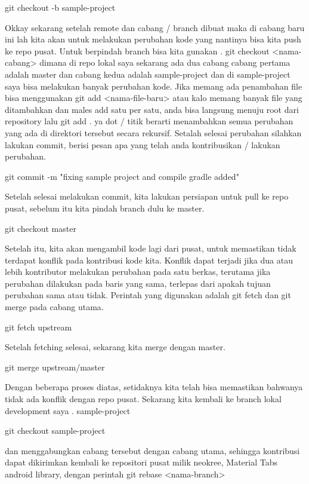 \noindent 
git checkout -b sample-project \par
\noindent 
Okkay sekarang setelah remote dan cabang / branch dibuat maka di cabang baru ini lah kita akan untuk melakukan perubahan kode yang nantinya bisa kita push ke repo pusat. Untuk berpindah branch bisa kita gunakan . git checkout <nama-cabang> dimana di repo lokal saya sekarang ada dua cabang cabang pertama adalah master dan cabang kedua adalah sample-project dan di sample-project saya bisa melakukan banyak perubahan kode. Jika memang ada penambahan file bisa menggunakan git add <nama-file-baru> atau kalo memang banyak file yang ditambahkan dan males add satu per satu, anda bisa langsung menuju root dari repository lalu git add . ya dot / titik berarti menambahkan semua perubahan yang ada di direktori tersebut secara rekursif. Setalah selesai perubahan silahkan lakukan commit, berisi pesan apa yang telah anda kontribusikan / lakukan perubahan. \par
\noindent 
git commit -m "fixing sample project and compile gradle added" \par
\noindent 
Setelah selesai melakukan commit, kita lakukan persiapan untuk pull ke repo pusat, sebelum itu kita pindah branch dulu ke master. \par
\noindent 
git checkout master \par
\noindent 
Setelah itu, kita akan mengambil kode lagi dari pusat, untuk memastikan tidak terdapat konflik pada kontribusi kode kita. Konflik dapat terjadi jika dua atau lebih kontributor melakukan perubahan pada satu berkas, terutama jika perubahan dilakukan pada baris yang sama, terlepas dari apakah tujuan perubahan sama atau tidak. Perintah yang digunakan adalah git fetch dan git merge pada cabang utama. \par
\noindent 
git fetch upstream \par
\noindent 
Setelah fetching selesai, sekarang kita merge dengan master. \par
\noindent 
git merge upstream/master \par
\noindent 
Dengan beberapa proses diatas, setidaknya kita telah bisa memastikan bahwanya tidak ada konflik dengan repo pusat. Sekarang kita kembali ke branch lokal development saya . sample-project \par
\noindent 
git checkout sample-project \par
\noindent 
dan menggabungkan cabang tersebut dengan cabang utama, sehingga kontribusi dapat dikirimkan kembali ke repositori pusat milik neokree, Material Tabs android library, dengan perintah git rebase <nama-branch> \par
